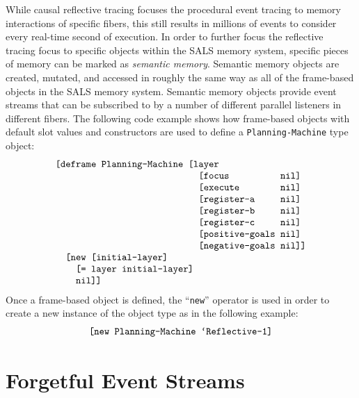 While causal reflective tracing focuses the procedural event tracing
to memory interactions of specific fibers, this still results in
millions of events to consider every real-time second of execution.
In order to further focus the reflective tracing focus to specific
objects within the SALS memory system, specific pieces of memory can
be marked as \emph{semantic memory}.  Semantic memory objects are
created, mutated, and accessed in roughly the same way as all of the
frame-based objects in the SALS memory system.  Semantic memory
objects provide event streams that can be subscribed to by a number of
different parallel listeners in different fibers.  The following code
example shows how frame-based objects with default slot values and
constructors are used to define a {\tt Planning-Machine} type object:
\begin{equation*}
\begin{array}{l}
\text{\tt [deframe Planning-Machine [layer} \\
\text{\tt ~~~~~~~~~~~~~~~~~~~~~~~~~~~~[focus ~~~~~~~~~nil]} \\
\text{\tt ~~~~~~~~~~~~~~~~~~~~~~~~~~~~[execute ~~~~~~~nil]} \\
\text{\tt ~~~~~~~~~~~~~~~~~~~~~~~~~~~~[register-a ~~~~nil]} \\
\text{\tt ~~~~~~~~~~~~~~~~~~~~~~~~~~~~[register-b ~~~~nil]} \\
\text{\tt ~~~~~~~~~~~~~~~~~~~~~~~~~~~~[register-c ~~~~nil]} \\
\text{\tt ~~~~~~~~~~~~~~~~~~~~~~~~~~~~[positive-goals nil]} \\
\text{\tt ~~~~~~~~~~~~~~~~~~~~~~~~~~~~[negative-goals nil]]} \\
\text{\tt ~~[new [initial-layer]} \\
\text{\tt ~~~~[= layer initial-layer]} \\
\text{\tt ~~~~nil]]}
\end{array}
\end{equation*}
Once a frame-based object is defined, the ``{\tt new}'' operator is
used in order to create a new instance of the object type as in the
following example:
\begin{equation*}
\begin{array}{l}
\text{\tt [new Planning-Machine `Reflective-1]} \\
\end{array}
\end{equation*}

\section{Forgetful Event Streams}

